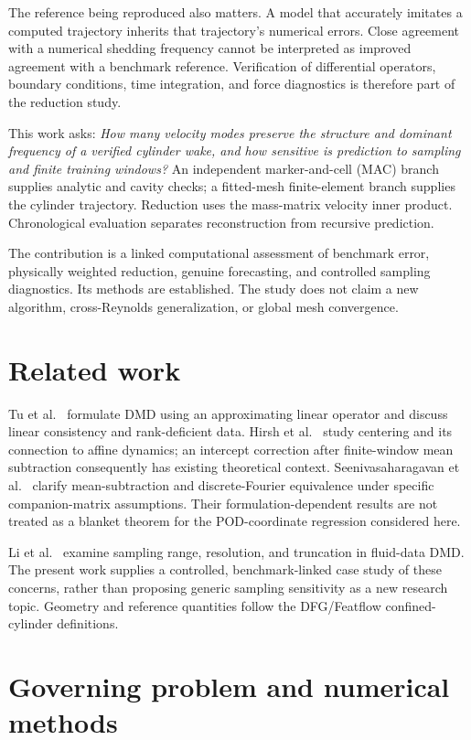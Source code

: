 \documentclass[11pt,a4paper]{article}
\begin{document}
The reference being reproduced also matters. A model that accurately imitates a computed trajectory inherits that trajectory's numerical errors. Close agreement with a numerical shedding frequency cannot be interpreted as improved agreement with a benchmark reference. Verification of differential operators, boundary conditions, time integration, and force diagnostics is therefore part of the reduction study.

This work asks: \emph{How many velocity modes preserve the structure and dominant frequency of a verified cylinder wake, and how sensitive is prediction to sampling and finite training windows?} An independent marker-and-cell (MAC) branch supplies analytic and cavity checks; a fitted-mesh finite-element branch supplies the cylinder trajectory. Reduction uses the mass-matrix velocity inner product. Chronological evaluation separates reconstruction from recursive prediction.

The contribution is a linked computational assessment of benchmark error, physically weighted reduction, genuine forecasting, and controlled sampling diagnostics. Its methods are established. The study does not claim a new algorithm, cross-Reynolds generalization, or global mesh convergence.

\section{Related work}
Tu et al.\ \cite{tu} formulate DMD using an approximating linear operator and discuss linear consistency and rank-deficient data. Hirsh et al.\ \cite{hirsh} study centering and its connection to affine dynamics; an intercept correction after finite-window mean subtraction consequently has existing theoretical context. Seenivasaharagavan et al.\ \cite{seen} clarify mean-subtraction and discrete-Fourier equivalence under specific companion-matrix assumptions. Their formulation-dependent results are not treated as a blanket theorem for the POD-coordinate regression considered here.

Li et al.\ \cite{li} examine sampling range, resolution, and truncation in fluid-data DMD. The present work supplies a controlled, benchmark-linked case study of these concerns, rather than proposing generic sampling sensitivity as a new research topic. Geometry and reference quantities follow the DFG/Featflow confined-cylinder definitions\cite{dfg,updated}.

\section{Governing problem and numerical methods}
\end{document}
